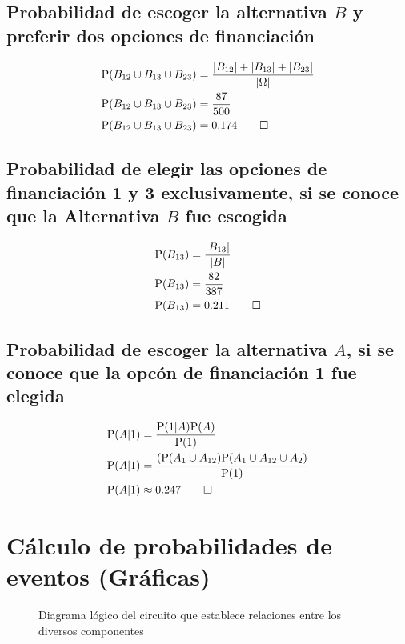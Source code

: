 \documentclass[paper=letterpaper]{article}
\begin{document}
\subsection{Probabilidad de escoger la alternativa $B$ y preferir dos opciones de financiaci\'{o}n}
\begin{alignat}{2}
\text{P}(B_{12} \cup B_{13} \cup B_{23}) &= \frac{\vert B_{12} \vert + \vert B_{13} \vert + \vert B_{23} \vert}{\vert \Omega \vert} \\
\text{P}(B_{12} \cup B_{13} \cup B_{23}) &= \frac{87}{500} \\
\text{P}(B_{12} \cup B_{13} \cup B_{23}) &= 0.174 \qed
\end{alignat}

\subsection{Probabilidad de elegir las opciones de financiaci\'{o}n 1 y 3 exclusivamente, si se conoce que la Alternativa $B$ fue escogida}
\begin{alignat}{2}
\text{P}(B_{13}) &= \frac{\vert B_{13} \vert}{\vert B \vert} \\
\text{P}(B_{13}) &= \frac{82}{387} \\
\text{P}(B_{13}) &= 0.211 \qed
\end{alignat}

\subsection{Probabilidad de escoger la alternativa $A$, si se conoce que la opc\'{o}n de financiaci\'{o}n 1 fue elegida}
\begin{alignat}{2}
\text{P}(A \vert 1) &= \frac{\text{P}(1 \vert A) \text{P}(A)}{\text{P}(1)} \\
\text{P}(A \vert 1) &= \frac{(\text{P}(A_{1} \cup A_{12})\text{P}(A_{1} \cup A_{12} \cup A_2) }{\text{P}(1)} \\
\text{P}(A \vert 1) &\approx 0.247 \qed
\end{alignat}

\section{Cálculo de probabilidades de eventos (Gráficas)}

\begin{figure}
\centering
{}
\caption{Diagrama l\'{o}gico del circuito que establece relaciones entre los diversos componentes}
\label{Fig:F2}
\end{figure}
\end{document}
